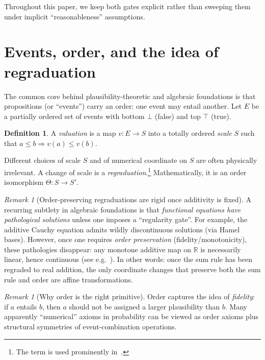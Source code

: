 \documentclass[11pt]{article}
\theoremstyle{definition}
\newtheorem{definition}[theorem]{Definition}
\theoremstyle{remark}
\newtheorem{remark}[theorem]{Remark}
\begin{document}
Throughout this paper, we keep both gates explicit rather than sweeping them under implicit
``reasonableness'' assumptions.

\section{Events, order, and the idea of regraduation}

The common core behind plausibility-theoretic and algebraic foundations is that propositions (or ``events'')
carry an order: one event may entail another.  Let $E$ be a partially ordered set of events with bottom
$\bot$ (false) and top $\top$ (true).

\begin{definition}
A \emph{valuation} is a map $v : E \to S$ into a totally ordered \emph{scale} $S$ such that
$a \le b \Rightarrow v(a) \le v(b)$.
\end{definition}

Different choices of scale $S$ and of numerical coordinate on $S$ are often physically irrelevant.
A change of scale is a \emph{regraduation}.\footnote{The term is used prominently in~\cite{KnuthSkilling2012}.}
Mathematically, it is an order isomorphism $\Theta : S \to S'$.

\begin{remark}[Order-preserving regraduations are rigid once additivity is fixed]
A recurring subtlety in algebraic foundations is that \emph{functional equations have pathological solutions}
unless one imposes a ``regularity gate''.
For example, the additive Cauchy equation admits wildly discontinuous solutions (via Hamel bases).
However, once one requires \emph{order preservation} (fidelity/monotonicity), these pathologies disappear:
any monotone additive map on $\mathbb{R}$ is necessarily linear, hence continuous
(see e.g.\ \cite{Aczel1966,Kuczma2009}).
In other words: once the sum rule has been regraded to real addition, the only coordinate changes that
preserve both the sum rule and order are affine transformations.
\end{remark}



\begin{remark}[Why order is the right primitive]
Order captures the idea of \emph{fidelity}: if $a$ entails $b$, then $a$ should not be assigned a larger
plausibility than $b$.  Many apparently ``numerical'' axioms in probability can be viewed as order axioms
plus structural symmetries of event-combination operations.
\end{remark}
\end{document}
